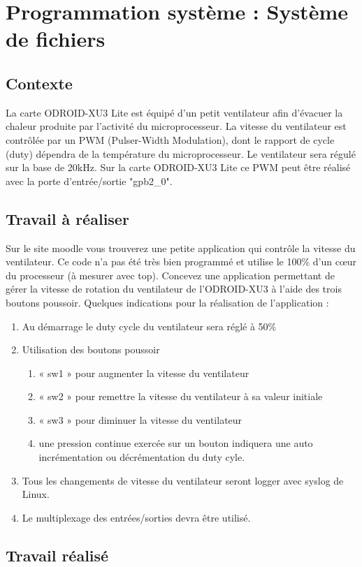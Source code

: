 \section{Programmation système : Système de fichiers}
\subsection{Contexte}
La	carte ODROID-XU3	Lite	est	équipé	d’un	petit	ventilateur	afin	d’évacuer	la	chaleur	produite	par	
l’activité	du	microprocesseur.	La	vitesse	du	ventilateur	est	contrôlée par	un	PWM	(Pulser-Width	
Modulation),	dont	le	rapport	de	cycle	(duty)	dépendra	de	la	température	du	microprocesseur.	Le	
ventilateur	sera	régulé	sur	la	base	de	20kHz.		Sur	la	carte	ODROID-XU3	Lite	ce	PWM	peut	être	réalisé	
avec	la	porte	d’entrée/sortie	"gpb2\_0".
\subsection{Travail à réaliser}
Sur	le	site	moodle	vous	trouverez	une	petite	application	qui	contrôle	la	vitesse	du	ventilateur.	Ce	code	
n’a	pas	été	très	bien	programmé	et	utilise	le	100\%	d’un	cœur	du	processeur	(à	mesurer	avec	top).	
Concevez	une	application	permettant	de	gérer	la	vitesse	de	rotation	du	ventilateur	de	l’ODROID-XU3	
à	l’aide	des	trois	boutons	poussoir.
Quelques	indications	pour	la	réalisation de	l’application :
\begin{enumerate}
\item Au	démarrage	le	duty	cycle	du	ventilateur	sera	réglé	à	50\%
\item Utilisation	des	boutons	poussoir
\begin{enumerate}
\item « sw1 »	pour	augmenter	la	vitesse	du	ventilateur
\item « sw2 »	pour	remettre	la	vitesse	du	ventilateur	à	sa	valeur	initiale
\item « sw3 »	pour	diminuer	la	vitesse	du	ventilateur
\item une	pression	continue	exercée	sur	un	bouton	indiquera	une	auto	incrémentation	
ou	décrémentation	du	duty	cyle.
\end{enumerate}
\item Tous	les	changements	de	vitesse	du	ventilateur	seront	logger	avec	syslog	de	Linux.
\item Le	multiplexage	des	entrées/sorties	devra	être	utilisé.
\end{enumerate}

\subsection{Travail réalisé}
